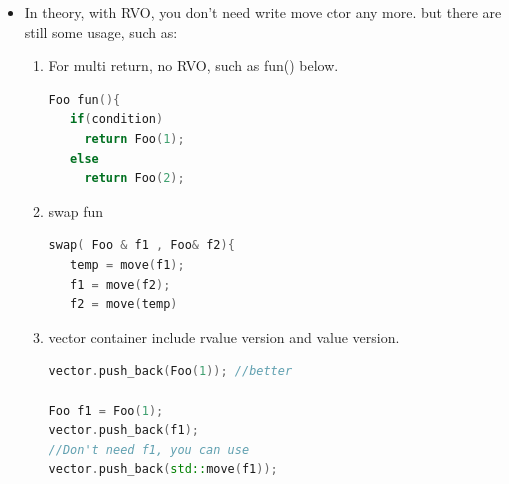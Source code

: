 \documentclass[a4paper,12pt,twoside]{book}
\begin{document}
\begin{itemize}
\item In theory, with RVO, you don't need write move ctor any more. but there are still some usage, such as:
\begin{enumerate}
\item For multi return, no RVO, such as fun() below.
\begin{lstlisting}[frame=single, language=c++]
Foo fun(){
   if(condition)
     return Foo(1);
   else
     return Foo(2);
\end{lstlisting}

\item swap fun
\begin{lstlisting}[frame=single, language=c++]
swap( Foo & f1 , Foo& f2){
   temp = move(f1);
   f1 = move(f2);
   f2 = move(temp)
\end{lstlisting}


\item vector container include rvalue version and value version.
\begin{lstlisting}[frame=single, language=c++]
vector.push_back(Foo(1)); //better

Foo f1 = Foo(1);
vector.push_back(f1);
//Don't need f1, you can use
vector.push_back(std::move(f1));
\end{lstlisting}
\end{enumerate}
\end{itemize}
\end{document}
